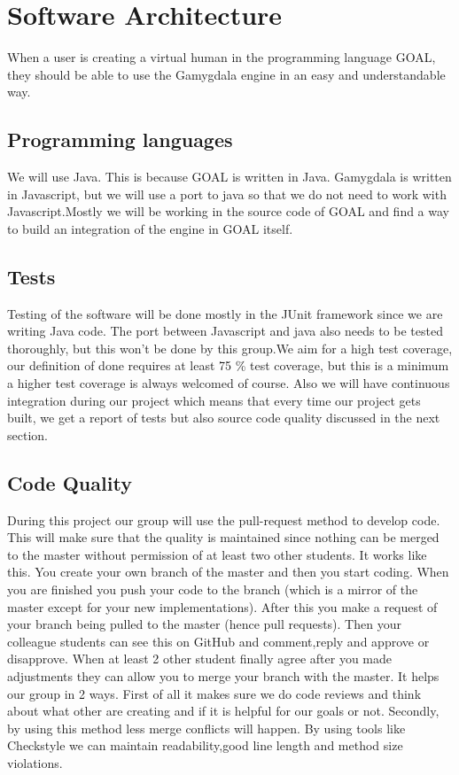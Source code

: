 \documentclass[]{article}
\begin{document}
\section{Software Architecture}
When a user is creating a \gls{virtual human} in the programming language GOAL, they should be able to use the Gamygdala engine in an easy and understandable way.
\subsection{Programming languages}
We will use Java. This is because GOAL is written in Java.
Gamygdala is written in Javascript, but we will use a port to java so that we do not need to work with Javascript.Mostly we will be working in the source code of GOAL and find a way to build an integration of the engine in GOAL itself.
\subsection{Tests}
Testing of the software will be done mostly in the \gls{JUnit} framework since we are writing Java code. The port between Javascript and java also needs to be tested thoroughly, but this won't be done by this group.We aim for a high test coverage, our definition of done requires at least 75 \% test coverage, but this is a minimum a higher test coverage is always welcomed of course. Also we will have continuous integration during our project which means that every time our project gets built, we get a report of tests but also source code quality discussed in the next section.

\subsection{Code Quality}
During this project our group will use the pull-request method to develop code. This will make sure that the quality is maintained since nothing can be merged to the \gls{master} without permission of at least two other students. It works like this. You create your own branch of the master and then you start coding. When you are finished you push your code to the branch (which is a mirror of the master except for your new implementations). After this you make a request of your branch being pulled to the master (hence pull requests). Then your colleague students can see this on GitHub and comment,reply and approve or disapprove. When at least 2 other student finally agree after you made adjustments they can allow you to merge your branch with the master. It helps our group in 2 ways. First of all it makes sure we do code reviews and think about what other are creating and if it is helpful for our goals or not. Secondly, by using this method less merge conflicts will happen.
By using tools like Checkstyle we can maintain readability,good line length and method size violations.
\end{document}
